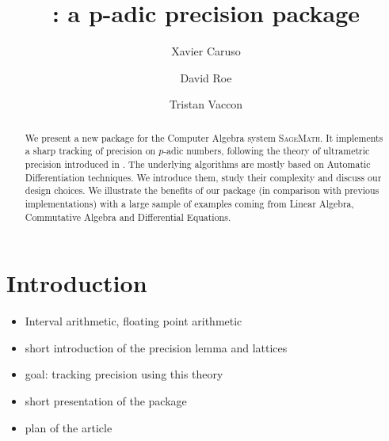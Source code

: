 \documentclass[sigconf]{acmart}
\newcommand{\sage}{\textsc{SageMath}\xspace}
\newcommand{\ZpL}{\text{\color{output} \rm \tt ZpL}\xspace}
\theoremstyle{definition}
\begin{document}
\title{\ZpL: a p-adic precision package}

\author{Xavier Caruso}
\author{David Roe}
\author{Tristan Vaccon}



\begin{abstract}
We present a new package \ZpL for the Computer Algebra system \sage. It 
implements a sharp tracking of precision on $p$-adic numbers, following 
the theory of ultrametric precision introduced in \cite{padicprec}. The 
underlying algorithms are mostly based on Automatic Differentiation 
techniques. We introduce them, study their complexity and discuss our 
design choices.
We illustrate the benefits of our package (in comparison with previous 
implementations) with a large sample of examples coming from Linear 
Algebra, Commutative Algebra and Differential Equations.
\end{abstract}

\maketitle

\section{Introduction}

\begin{itemize}
\item Interval arithmetic, floating point arithmetic
\item short introduction of the precision lemma and lattices
\item goal: tracking precision using this theory
\item short presentation of the package
\item plan of the article
\end{itemize}
\end{document}
